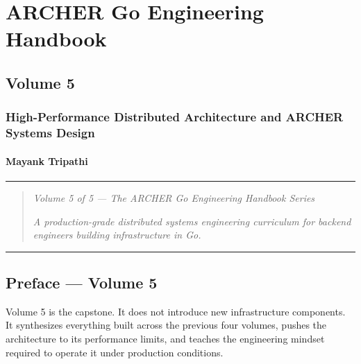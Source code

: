 \documentclass[
]{article}
\author{}
\date{}
\begin{document}
\hypertarget{archer-go-engineering-handbook}{%
\section{ARCHER Go Engineering
Handbook}\label{archer-go-engineering-handbook}}

\hypertarget{volume-5}{%
\subsection{Volume 5}\label{volume-5}}

\hypertarget{high-performance-distributed-architecture-and-archer-systems-design}{%
\subsubsection{High-Performance Distributed Architecture and ARCHER
Systems
Design}\label{high-performance-distributed-architecture-and-archer-systems-design}}

\hypertarget{mayank-tripathi}{%
\paragraph{Mayank Tripathi}\label{mayank-tripathi}}

\begin{center}\rule{0.5\linewidth}{0.5pt}\end{center}

\begin{quote}
\emph{Volume 5 of 5 --- The ARCHER Go Engineering Handbook Series}

\emph{A production-grade distributed systems engineering curriculum for
backend engineers building infrastructure in Go.}
\end{quote}

\begin{center}\rule{0.5\linewidth}{0.5pt}\end{center}

\hypertarget{preface-volume-5}{%
\subsection{Preface --- Volume 5}\label{preface-volume-5}}

Volume 5 is the capstone. It does not introduce new infrastructure
components. It synthesizes everything built across the previous four
volumes, pushes the architecture to its performance limits, and teaches
the engineering mindset required to operate it under production
conditions.
\end{document}
